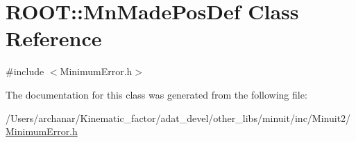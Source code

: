 \hypertarget{classROOT_1_1Minuit2_1_1MinimumError_1_1MnMadePosDef}{}\section{R\+O\+OT\+:\+:Mn\+Made\+Pos\+Def Class Reference}
\label{classROOT_1_1Minuit2_1_1MinimumError_1_1MnMadePosDef}


{\ttfamily \#include $<$Minimum\+Error.\+h$>$}



The documentation for this class was generated from the following file\+:\begin{DoxyCompactItemize}
\item 
/\+Users/archanar/\+Kinematic\+\_\+factor/adat\+\_\+devel/other\+\_\+libs/minuit/inc/\+Minuit2/\mbox{\hyperlink{other__libs_2minuit_2inc_2Minuit2_2MinimumError_8h}{Minimum\+Error.\+h}}\end{DoxyCompactItemize}
